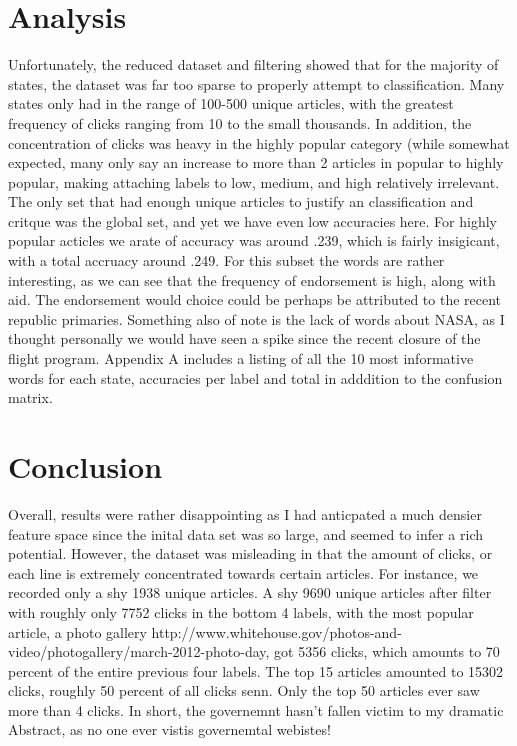 \documentclass[11pt]{article}
\begin{document}
\section{Analysis}
Unfortunately, the reduced dataset and filtering showed that for the majority of states, the dataset was far too sparse to properly attempt to classification.  Many states only had in the range of 100-500 unique articles, with the greatest frequency of clicks ranging from 10 to the small thousands.  In addition, the concentration of clicks was heavy in the highly popular category (while somewhat expected, many only say an increase to more than 2 articles in popular to highly popular, making attaching labels to low, medium, and high relatively irrelevant.  The only set that had enough unique articles to justify an classification and critque was the global set, and yet we have even low accuracies here. For highly popular acticles we arate of accuracy was around .239, which is fairly insigicant, with a total accruacy around .249.  For this subset the words are rather interesting, as we can see that the frequency of endorsement is high, along with aid.  The endorsement would choice could be perhaps be attributed to the recent republic primaries.  Something also of note is the lack of words about NASA, as I thought personally we would have seen a spike since the recent closure of the flight program. Appendix A includes a listing of all the 10 most informative words for each state, accuracies per label and total in adddition to the confusion matrix.

\section{Conclusion}
Overall, results were rather disappointing as I had anticpated a much densier feature space since the inital data set was so large, and seemed to infer a rich potential.  However,  the dataset was misleading in that the amount of clicks, or each line is extremely concentrated towards certain articles.  For instance, we recorded only a shy 1938 unique articles. A shy 9690 unique articles after filter with roughly only 7752 clicks in the bottom 4 labels, with the most popular article, a photo gallery http://www.whitehouse.gov/photos-and-video/photogallery/march-2012-photo-day, got 5356 clicks, which amounts to 70 percent of the entire previous four labels.  The top 15 articles amounted to 15302 clicks, roughly 50 percent of all clicks senn.  Only the top 50 articles ever saw more than 4 clicks. In short, the governemnt hasn't fallen victim to my dramatic Abstract, as no one ever vistis governemtal webistes!
\end{document}
